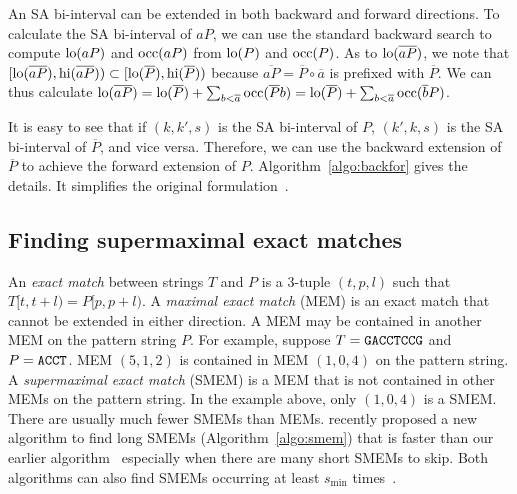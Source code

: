 \documentclass[webpdf,contemporary,large,namedate]{oup-authoring-template}%
\begin{document}
An SA bi-interval can be extended in both backward and forward directions.
To calculate the SA bi-interval of $aP$, we can use the standard backward search to compute ${\rm lo}(aP)$ and ${\rm occ}(aP)$ from ${\rm lo}(P)$ and ${\rm occ}(P)$.
As to ${\rm lo}(\overline{aP})$, we note that $[{\rm lo}(\overline{aP}),{\rm hi}(\overline{aP}))\subset[{\rm lo}(\overline{P}),{\rm hi}(\overline{P}))$
because $\overline{aP}=\overline{P}\circ\overline{a}$ is prefixed with $\overline{P}$.
We can thus calculate ${\rm lo}(\overline{aP})={\rm lo}(\overline{P})+\sum_{b<\overline{a}}{\rm occ}(\overline{P}b)={\rm lo}(\overline{P})+\sum_{b<\overline{a}}{\rm occ}(\overline{b}P)$.

It is easy to see that if $(k,k',s)$ is the SA bi-interval of $P$, $(k',k,s)$ is the SA bi-interval of $\overline{P}$, and vice versa.
Therefore, we can use the backward extension of $\overline{P}$ to achieve the forward extension of $P$.
Algorithm~\ref{algo:backfor} gives the details.
It simplifies the original formulation~\citep{Li:2012fk}.

\subsection{Finding supermaximal exact matches}

An \emph{exact match} between strings $T$ and $P$ is a 3-tuple $(t,p,l)$ such that $T[t,t+l)=P[p,p+l)$.
A \emph{maximal exact match} (MEM) is an exact match that cannot be extended in either direction.
A MEM may be contained in another MEM on the pattern string $P$.
For example, suppose $T={\tt GACCTCCG}$ and $P={\tt ACCT}$.
MEM $(5,1,2)$ is contained in MEM $(1,0,4)$ on the pattern string.
A \emph{supermaximal exact match} (SMEM) is a MEM that is not contained in other MEMs on the pattern string.
In the example above, only $(1,0,4)$ is a SMEM.
There are usually much fewer SMEMs than MEMs.
\citet{DBLP:conf/dlt/Gagie24} recently proposed a new algorithm to find long SMEMs (Algorithm~\ref{algo:smem})
that is faster than our earlier algorithm~\citep{Li:2012fk}
especially when there are many short SMEMs to skip.
Both algorithms can also find SMEMs occurring at least $s_{\min}$ times~\citep{DBLP:conf/cpm/TatarnikovFKG23}.
\end{document}
